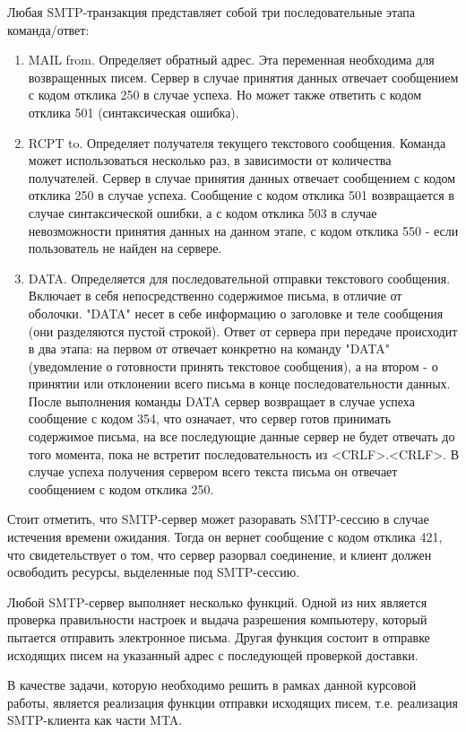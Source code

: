 \documentclass[a4paper,12pt]{report}
\begin{document}
	Любая SMTP-транзакция представляет собой три последовательные этапа команда/ответ:
	\begin{enumerate}
		\item MAIL from. Определяет обратный адрес. Эта переменная необходима для возвращенных писем. Сервер в случае принятия данных отвечает сообщением с кодом отклика 250 в случае успеха. Но может также ответить с кодом отклика 501 (синтаксическая ошибка). 
		\item RCPT to. Определяет получателя текущего текстового сообщения. Команда может использоваться несколько раз, в зависимости от количества получателей. Сервер в случае принятия данных отвечает сообщением с кодом отклика 250 в случае успеха. Сообщение с кодом отклика 501 возвращается в случае синтаксической ошибки, а с кодом отклика 503 в случае невозможности принятия данных на данном этапе, с кодом отклика 550 - если пользователь не найден на сервере.
		\item DATA. Определяется для последовательной отправки текстового сообщения. Включает в себя непосредственно содержимое письма, в отличие от оболочки. "DATA" несет в себе информацию о заголовке и теле сообщения (они разделяются пустой строкой). Ответ от сервера при передаче происходит в два этапа: на первом от отвечает конкретно на команду "DATA" (уведомление о готовности принять текстовое сообщения), а на втором - о принятии или отклонении всего письма в конце последовательности данных. После выполнения команды DATA сервер возвращает в случае успеха сообщение с кодом 354, что означает, что сервер готов принимать содержимое письма, на все последующие данные сервер не будет отвечать до того момента, пока не встретит последовательность из <CRLF>.<CRLF>. В случае успеха получения сервером всего текста письма он отвечает сообщением с кодом отклика 250.
	\end{enumerate}

	Стоит отметить, что SMTP-сервер может разоравать SMTP-сессию в случае истечения времени ожидания. 
	Тогда он вернет сообщение с кодом отклика 421, что свидетельствует о том, что сервер разорвал соединение,
	 и клиент должен освободить ресурсы, выделенные под SMTP-сессию.  

	Любой SMTP-сервер выполняет несколько функций. 
	Одной из них является проверка правильности настроек и выдача разрешения компьютеру, который пытается отправить электронное письма. 
	Другая функция состоит в отправке исходящих писем на указанный адрес с последующей проверкой доставки. 
	
	В качестве задачи, которую необходимо решить в рамках данной курсовой работы, является реализация функции отправки исходящих писем, 
	т.е. реализация SMTP-клиента как части MTA.
	 
\end{document}
